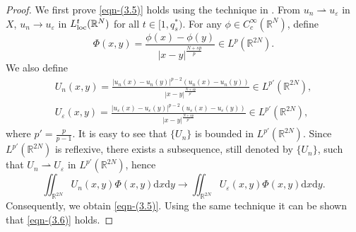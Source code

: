 \documentclass[reqno]{amsart}
\begin{document}
\begin{proof}
We first prove \eqref{eqn-(3.5)} holds using the technique in \cite{n5}.
From $u_n \rightharpoonup u_{\varepsilon}$ in $X$,  $u_n \to u_{\varepsilon}$ in 
$L_{\rm loc}^t(\mathbb{R}^N)$ for all $t \in [1,q_{s}^{\ast})$.
For any $\phi \in C_c^{\infty}(\mathbb{R}^N)$, define
\[
\Phi(x,y) = \frac{\phi(x) - \phi(y)}{|x - y|^{\frac{N+sp}{p}}} \in L^p(\mathbb{R}^{2N}).
\]
We also define
\begin{gather*}
U_n(x,y) = \frac{|u_n(x) - u_n(y)|^{p-2}(u_n(x) - u_n(y))}{|x - y|^{\frac{N+sp}{p'}}}
\in L^{p'}(\mathbb{R}^{2N}), \\
U_\varepsilon(x,y) = \frac{|u_\varepsilon(x) 
- u_\varepsilon(y)|^{p-2}(u_\varepsilon(x) - u_\varepsilon(y))}{|x - y|^{\frac{N+sp}{p'}}}
\in L^{p'}(\mathbb{R}^{2N}),
\end{gather*}
where $p' = \frac{p}{p-1}$. It is easy to see that $\{U_n\}$ is  bounded in 
$L^{p'}(\mathbb{R}^{2N})$. Since $L^{p'}(\mathbb{R}^{2N})$ is reflexive,  
there exists a subsequence, still denoted by $\{U_n\}$, such
that  $U_n \rightharpoonup U_\varepsilon$ in $L^{p'}(\mathbb{R}^{2N})$, hence
\[
\iint_{\mathbb{R}^{2N}} U_n(x,y)\Phi(x,y)\mathrm{d}x\mathrm{d}y 
\to \iint_{\mathbb{R}^{2N}} U_\varepsilon(x,y)\Phi(x,y)\mathrm{d}x\mathrm{d}y.
\]
Consequently, we obtain \eqref{eqn-(3.5)}.
Using the same technique it can be shown that \eqref{eqn-(3.6)} holds.


\end{proof}
\end{document}
